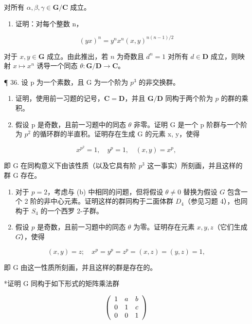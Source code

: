 对所有 \(\alpha, \beta, \gamma \in \mathbf{G} / \mathbf{C}\) 成立。

\begin{enumerate}
\def\labelenumi{(\alph{enumi})}
\setcounter{enumi}{1}
\tightlist
\item
  证明：对每个整数 n，
\end{enumerate}

\[
(y x) ^ {n} = y ^ {n} x ^ {n} (x, y) ^ {n (n - 1) / 2}
\]

对于 \(x, y \in \mathbf{G}\) 成立。由此推出，若 \(n\) 为奇数且 \(d^n = 1\) 对所有 \(d \in \mathbf{D}\) 成立，则映射 \(x \mapsto x^n\) 诱导一个同态 \(\theta: \mathbf{G} / \mathbf{D} \to \mathbf{C}\)。

¶ 36. 设 p 为一个素数，且 G 为一个阶为 \(p^{3}\) 的非交换群。

\begin{enumerate}
\def\labelenumi{(\alph{enumi})}
\item
  证明，使用前一习题的记号，\(\mathbf{C} = \mathbf{D}\)，并且 \(\mathbf{G} / \mathbf{D}\) 同构于两个阶为 \(p\) 的群的乘积。
\item
  假设 p 是奇数，且前一习题中的同态 \(\theta\) 非零。证明 G 是一个 p 阶群与一个阶为 \(p^{2}\) 的循环群的半直积。证明存在生成 G 的元素 x, y，使得
\end{enumerate}

\[
x ^ {p ^ {2}} = 1, \quad y ^ {p} = 1, \quad (x, y) = x ^ {p},
\]

即 G 在同构意义下由该性质（以及它具有阶 \(p^{3}\) 这一事实）所刻画，并且这样的群 G 存在。

\begin{enumerate}
\def\labelenumi{(\alph{enumi})}
\setcounter{enumi}{2}
\item
  对于 \(p = 2\)，考虑与 (b) 中相同的问题，但将假设 \(\theta \neq 0\) 替换为假设 \(G\) 包含一个 2 阶的非中心元素。证明这样的群同构于二面体群 \(D_4\)（参见习题 4），也同构于 \(S_4\) 的一个西罗 2-子群。
\item
  假设 \(p\) 是奇数，且前一习题中的同态 \(\theta\) 为零。证明存在元素 \(x, y, z\)（它们生成 \(G\)），使得
\end{enumerate}

\[
(x, y) = z; \quad x ^ {p} = y ^ {p} = z ^ {p} = (x, z) = (y, z) = 1,
\]

即 G 由这一性质所刻画，并且这样的群是存在的。

*证明 G 同构于如下形式的矩阵乘法群

\[
\left( \begin{array}{c c c} 1 & a & b \\ 0 & 1 & c \\ 0 & 0 & 1 \end{array} \right)
\]

